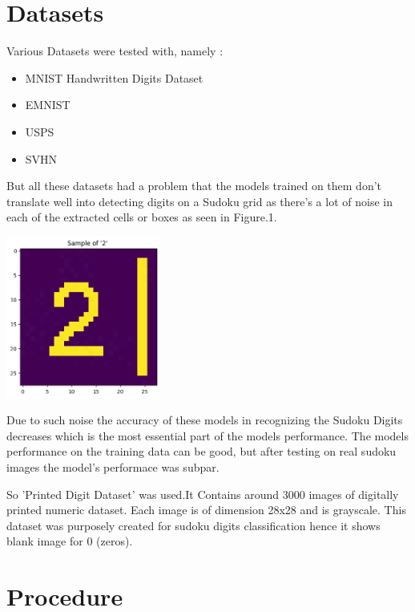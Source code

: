 \documentclass[a4paper,12pt]{article}
\begin{document}
   \section{Datasets}
    Various Datasets were tested with, namely : 
    \begin{itemize}
        \item MNIST Handwritten Digits Dataset
        \item EMNIST
        \item USPS
        \item SVHN
    \end{itemize}
    But all these datasets had a problem that the models trained on them don't translate well into detecting digits on a Sudoku grid as there's a lot of noise in each of the extracted cells or boxes as seen in Figure.1.
    \begin{center}
        \includegraphics[width=2in]{2.png}
        \label{fig:figure_label}
    \end{center}
    Due to such noise the accuracy of these models in recognizing the Sudoku Digits decreases which is the most essential part of the models performance. The models performance on the training data can be good, but after testing on real sudoku images the model's performace was subpar.
     




So 'Printed Digit Dataset' was used.It Contains around 3000 images of digitally printed numeric dataset.
    Each image is of dimension 28x28 and is grayscale.
This dataset was purposely created for sudoku digits classification hence it shows blank image for 0 (zeros).
  \section{Procedure}
\end{document}
